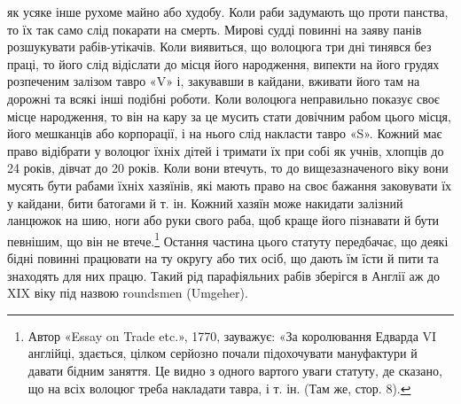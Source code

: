 \parcont{}  %
як усяке інше рухоме майно або худобу. Коли раби задумають
що проти панства, то їх так само слід покарати на смерть. Мирові
судді повинні на заяву панів розшукувати рабів-утікачів.
Коли виявиться, що волоцюга три дні тинявся без праці, то його
слід відіслати до місця його народження, випекти на його грудях
розпеченим залізом тавро «V» і, закувавши в кайдани, вживати
його там на дорожні та всякі інші подібні роботи. Коли волоцюга
неправильно показує своє місце народження, то він на кару
за це мусить стати довічним рабом цього місця, його мешканців
або корпорації, і на нього слід накласти тавро «S». Кожний
має право відібрати у волоцюг їхніх дітей і тримати їх при собі
як учнів, хлопців до 24 років, дівчат до 20 років. Коли вони втечуть,
то до вищезазначеного віку вони мусять бути рабами їхніх
хазяїнів, які мають право на своє бажання заковувати їх у
кайдани, бити батогами й т. ін. Кожний хазяїн може накидати
залізний ланцюжок на шию, ноги або руки свого раба, щоб краще
його пізнавати й бути певнішим, що він не втече.\footnote{
Автор «Essay on Trade etc.», 1770, зауважує: «За королювання
Едварда VI англійці, здається, цілком серйозно почали підохочувати
мануфактури й давати бідним заняття. Це видно з одного вартого уваги
статуту, де сказано, що на всіх волоцюг треба накладати тавра, і т. ін.
(Там же, стор. 8).
} Остання
частина цього статуту передбачає, що деякі бідні повинні працювати
на ту округу або тих осіб, що дають їм їсти й пити та знаходять
для них працю. Такий рід парафіяльних рабів зберігся
в Англії аж до XIX віку під назвою roundsmen (Umgeher).

